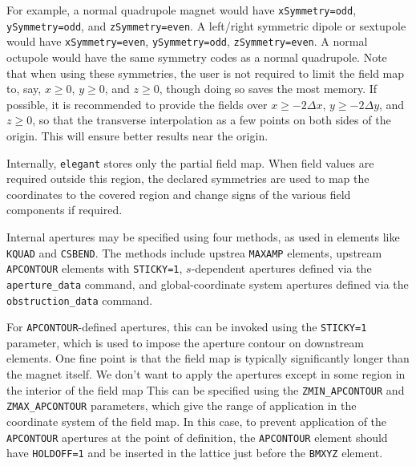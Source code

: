 For example, a normal quadrupole magnet would have
\verb|xSymmetry=odd|, \verb|ySymmetry=odd|, and \verb|zSymmetry=even|.  A left/right symmetric dipole or sextupole
would have \verb|xSymmetry=even|, \verb|ySymmetry=odd|,
\verb|zSymmetry=even|.  A normal octupole would have the same symmetry codes as a normal quadrupole.
Note that when using these symmetries, the user is not required to limit the field map to, say, 
$x\geq 0$, $y\geq 0$, and $z\geq 0$, though doing so saves the most memory.
If possible, it is recommended to provide the fields over $x\geq -2\Delta x$, $y\geq -2\Delta y$, 
and $z\geq 0$, so that the transverse interpolation as a few points on both sides of the origin.
This will ensure better results near the origin.

Internally, {\tt elegant} stores only the partial field map. When field values are required outside this region, the
declared symmetries are used to map the coordinates to the covered region and change signs of the various field
components if required.

Internal apertures may be specified using four methods, as used in elements like \verb|KQUAD| and
\verb|CSBEND|. The methods include upstrea \verb|MAXAMP| elements, upstream \verb|APCONTOUR| elements
with \verb|STICKY=1|, $s$-dependent apertures defined via the \verb|aperture_data| command,
and global-coordinate system apertures defined via the \verb|obstruction_data| command.

For \verb|APCONTOUR|-defined apertures, this can be invoked using the \verb|STICKY=1| parameter,
which is used to impose the aperture contour on downstream elements.
One fine point is that the field map is typically significantly longer than the magnet itself.
We don't want to apply the apertures except in some region in the interior of the field map
This can be specified using the \verb|ZMIN_APCONTOUR| and \verb|ZMAX_APCONTOUR| parameters,
which give the range of application in the coordinate system of the field map.
In this case, to prevent application of the \verb|APCONTOUR| apertures at the point of 
definition, the \verb|APCONTOUR| element should have \verb|HOLDOFF=1| and be inserted
in the lattice just before the \verb|BMXYZ| element.

